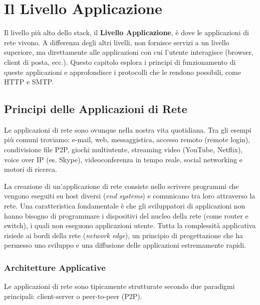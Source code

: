 \chapter{Il Livello Applicazione}
Il livello più alto dello stack, il \textbf{Livello Applicazione}, è dove le applicazioni di rete vivono. A differenza degli altri livelli, non fornisce servizi a un livello superiore, ma direttamente alle applicazioni con cui l'utente interagisce (browser, client di posta, ecc.). Questo capitolo esplora i principi di funzionamento di queste applicazioni e approfondisce i protocolli che le rendono possibili, come HTTP e SMTP.

\section{Principi delle Applicazioni di Rete}
Le applicazioni di rete sono ovunque nella nostra vita quotidiana. Tra gli esempi più comuni troviamo: e-mail, web, messaggistica, accesso remoto (remote login), condivisione file P2P, giochi multiutente, streaming video (YouTube, Netflix), voice over IP (es. Skype), videoconferenza in tempo reale, social networking e motori di ricerca.

La creazione di un'applicazione di rete consiste nello scrivere programmi che vengono eseguiti su host diversi (\textit{end systems}) e comunicano tra loro attraverso la rete. Una caratteristica fondamentale è che gli sviluppatori di applicazioni non hanno bisogno di programmare i dispositivi del nucleo della rete (come router e switch), i quali non eseguono applicazioni utente. Tutta la complessità applicativa risiede ai bordi della rete (\textit{network edge}), un principio di progettazione che ha permesso uno sviluppo e una diffusione delle applicazioni estremamente rapidi.


\subsection{Architetture Applicative}
Le applicazioni di rete sono tipicamente strutturate secondo due paradigmi principali: client-server o peer-to-peer (P2P).

